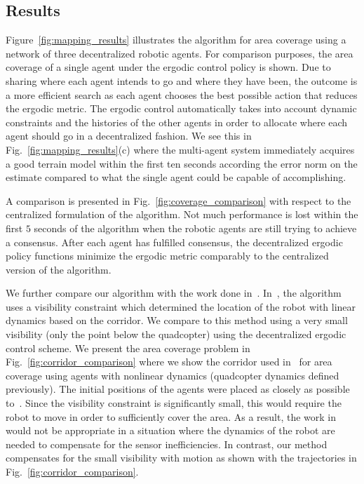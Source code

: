 \documentclass[letterpaper, 10 pt, conference]{ieeeconf}  %
\begin{document}
\subsection{Results}
Figure~\ref{fig:mapping_results} illustrates the algorithm for area coverage using a network of three decentralized robotic agents.
For comparison purposes, the area coverage of a single agent under the ergodic control policy is shown.
Due to sharing where each agent intends to go and where they have been, the outcome is a more efficient search as each agent chooses the best possible action that reduces the ergodic metric. 
The ergodic control automatically takes into account dynamic constraints and the histories of the other agents in order to allocate where each agent should go in a decentralized fashion.
We see this in Fig.~\ref{fig:mapping_results}(c) where the multi-agent system immediately acquires a good terrain model within the first ten seconds according the error norm on the estimate compared to what the single agent could be capable of accomplishing.

A comparison is presented in Fig.~\ref{fig:coverage_comparison} with respect to the centralized formulation of the algorithm.
Not much performance is lost within the first $5$ seconds of the algorithm when the robotic agents are still trying to achieve a consensus.
After each agent has fulfilled consensus, the decentralized ergodic policy functions minimize the ergodic metric comparably to the centralized version of the algorithm.


We further compare our algorithm with the work done in~\cite{kantaros2015distributed}. 
In~\cite{kantaros2015distributed}, the algorithm uses a visibility constraint which determined the location of the robot with linear dynamics based on the corridor.
We compare to this method using a very small visibility (only the point below the quadcopter) using the decentralized ergodic control scheme.
We present the area coverage problem in Fig.~\ref{fig:corridor_comparison} where we show the corridor used in~\cite{kantaros2015distributed} for area coverage using agents with nonlinear dynamics (quadcopter dynamics defined previously).
The initial positions of the agents were placed as closely as possible to~\cite{kantaros2015distributed}.
Since the visibility constraint is significantly small, this would require the robot to move in order to sufficiently cover the area.
As a result, the work in~\cite{kantaros2015distributed} would not be appropriate in a situation where the dynamics of the robot are needed to compensate for the sensor inefficiencies.
In contrast, our method compensates for the small visibility with motion as shown with the trajectories in Fig.~\ref{fig:corridor_comparison}.
\end{document}
